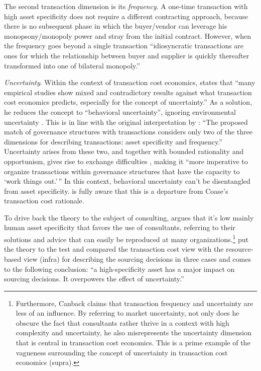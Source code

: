 \documentclass[12pt]{article}
\begin{document}
The second transaction dimension is its \emph{frequency}. A one-time
transaction with high asset specificity does not require a different
contracting approach, because there is no subsequent phase in which the
buyer/vendor can leverage his monopsony/monopoly power and stray from
the initial contract. However, when the frequency goes beyond a single
transaction ``idiosyncratic transactions are ones for which the
relationship between buyer and supplier is quickly thereafter
transformed into one of bilateral monopoly.'' \citep[
241]{williamson1985}

\emph{Uncertainty}. Within the context of transaction cost economics,
\citet[38]{shin2003} states that ``many empirical studies show mixed and
contradictory results against what transaction cost economics predicts,
especially for the concept of uncertainty.'' As a solution, he reduces
the concept to ``behavioral uncertainty'', ignoring environmental
uncertainty \citep[ 391-392]{watjatrakul2005}. This is in line with the
original interpretation by \citet[79]{williamson1985}: ``The proposed
match of governance structures with transactions considers only two of
the three dimensions for describing transactions: asset specificity and
frequency.'' Uncertainty arises from these two, and together with
bounded rationality and opportunism, gives rise to exchange difficulties
\citep[ 7]{williamson1975}, making it ``more imperative to organize
transactions within governance structures that have the capacity to
`work things out.'\,'' \citep[ 79]{williamson1985} In this context,
behavioral uncertainty can't be disentangled from asset specificity.
\citet[78]{williamson1985} is fully aware that this is a departure from
Coase's transaction cost rationale.

To drive back the theory to the subject of consulting,
\citet[37]{canback1998} argues that it's low mainly human asset
specificity that favors the use of consultants, referring to their
solutions and advice that can easily be reproduced at many
organizations.\footnote{Furthermore, Canback claims that transaction
  frequency and uncertainty are less of an influence. By referring to
  market uncertainty, not only does he obscure the fact that consultants
  rather thrive in a context with high complexity and uncertainty, he
  also misrepresents the uncertainty dimension that is central in
  transaction cost economics. This is a prime example of the vagueness
  surrounding the concept of uncertainty in transaction cost economics
  (supra).} \citet[408]{watjatrakul2005} put the theory to the test and
compared the transaction cost view with the resource-based view (infra)
for describing the sourcing decisions in three cases and comes to the
following conclusion: ``a high-specificity asset has a major impact on
sourcing decisions. It overpowers the effect of uncertainty.''
\end{document}
